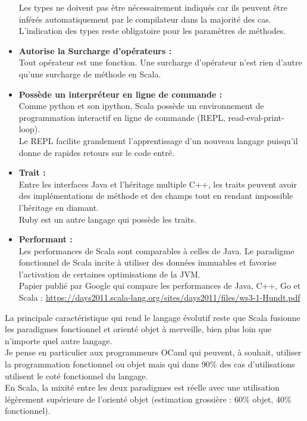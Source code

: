 \begin{itemize}
  Les types ne doivent pas être nécessairement indiqués car ils peuvent être
  inférés automatiquement par le compilateur dans la majorité des cas.\\
  L'indication des types reste obligatoire pour les paramètres de méthodes.\\
\item[\textbullet]\textbf{Autorise la Surcharge d'opérateurs :}\\
  Tout opérateur est une fonction. Une surcharge d'opérateur n'est rien d'autre
  qu'une surcharge de méthode en Scala.\\
\item[\textbullet]\textbf{Possède un interpréteur en ligne de commande :}\\ 
  Comme python et son ipython, Scala possède un environnement de programmation
  interactif en ligne de commande (REPL, read-eval-print-loop).\\
  Le REPL facilite grandement l'apprentissage d'un nouveau langage puisqu'il
  donne de rapides retours sur le code entré.\\
\item[\textbullet]\textbf{Trait :}\\Entre les interfaces Java et l'héritage
  multiple C++, les traits peuvent avoir des implémentations de méthode et des
  champs tout en rendant impossible l'héritage en diamant.\\
  Ruby est un autre langage qui possède les traits.\\  
\item[\textbullet]\textbf{Performant :}\\Les performances de Scala sont comparables
  à celles de Java. Le paradigme fonctionnel de Scala incite à utiliser des
  données immuables et favorise l'activation de certaines optimisations de la
  JVM.\\
  Papier publié par Google qui compare les performances de Java, C++, Go et Scala :
  \url{https://days2011.scala-lang.org/sites/days2011/files/ws3-1-Hundt.pdf}\\
\end{itemize}


La principale caractéristique qui rend le langage évolutif reste que Scala
fusionne les paradigmes fonctionnel et orienté objet à merveille, bien plus loin
que n'importe quel autre langage.\\
Je pense en particulier aux programmeurs OCaml qui peuvent, à souhait, utiliser
la programmation fonctionnel ou objet mais qui dans 90\% des cas d'utilisations
utilisent le coté fonctionnel du langage.\\
En Scala, la mixité entre les deux paradigmes est réelle avec une utilisation
légèrement supérieure de l'orienté objet (estimation grossière : 60\% objet, 40\%
fonctionnel).\\

